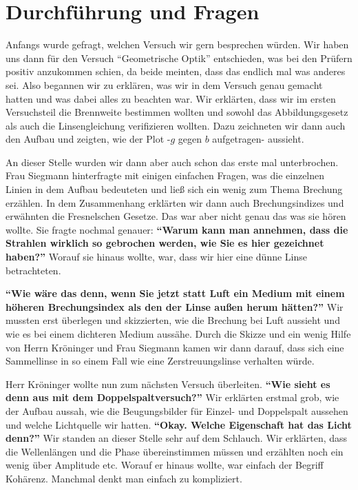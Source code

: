 \section{Durchführung und Fragen}

\noindent Anfangs wurde gefragt, welchen Versuch wir gern besprechen würden. Wir haben uns dann für den Versuch \enquote{Geometrische Optik} entschieden, was bei den Prüfern positiv anzukommen schien, da beide meinten, dass das endlich mal was anderes sei. 
Also begannen wir zu erklären, was wir in dem Versuch genau gemacht hatten und was dabei alles zu beachten war. Wir erklärten, dass wir im ersten Versuchsteil die Brennweite bestimmen wollten und sowohl das Abbildungsgesetz als auch die Linsengleichung verifizieren wollten.
Dazu zeichneten wir dann auch den Aufbau und zeigten, wie der Plot -$g$ gegen $b$ aufgetragen- aussieht. 

\noindent An dieser Stelle wurden wir dann aber auch schon das erste mal unterbrochen. Frau Siegmann hinterfragte mit einigen einfachen Fragen, was die einzelnen Linien in dem Aufbau bedeuteten und ließ sich ein wenig zum Thema Brechung erzählen. 
In dem Zusammenhang erklärten wir dann auch Brechungsindizes und erwähnten die Fresnelschen Gesetze. 
Das war aber nicht genau das was sie hören wollte. Sie fragte nochmal genauer: \textbf{\enquote{Warum kann man annehmen, dass die Strahlen wirklich so gebrochen werden, wie Sie es hier gezeichnet haben?}} 
Worauf sie hinaus wollte, war, dass wir hier eine dünne Linse betrachteten.

\noindent \textbf{\enquote{Wie wäre das denn, wenn Sie jetzt statt Luft ein Medium mit einem höheren Brechungsindex als den der Linse außen herum hätten?}}
Wir mussten erst überlegen und skizzierten, wie die Brechung bei Luft aussieht und wie es bei einem dichteren Medium aussähe. 
Durch die Skizze und ein wenig Hilfe von Herrn Kröninger und Frau Siegmann kamen wir dann darauf, dass sich eine Sammellinse in so einem Fall wie eine Zerstreuungslinse verhalten würde.

\noindent Herr Kröninger wollte nun zum nächsten Versuch überleiten. \textbf{\enquote{Wie sieht es denn aus mit dem Doppelspaltversuch?}} 
Wir erklärten erstmal grob, wie der Aufbau aussah, wie die Beugungsbilder für Einzel- und Doppelspalt aussehen und welche Lichtquelle wir hatten. 
\textbf{\enquote{Okay. Welche Eigenschaft hat das Licht denn?}}
Wir standen an dieser Stelle sehr auf dem Schlauch. Wir erklärten, dass die Wellenlängen und die Phase übereinstimmen müssen und erzählten noch ein wenig über Amplitude etc. Worauf er hinaus wollte, war einfach der Begriff Kohärenz. 
Manchmal denkt man einfach zu kompliziert.

